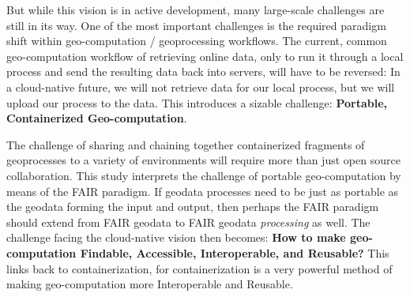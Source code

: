 But while this vision is in active development, many large-scale challenges are still in its way. 
One of the most important challenges is the required paradigm shift within geo-computation / geoprocessing workflows. 
The current, common geo-computation workflow of retrieving online data, only to run it through a local process and send the resulting data back into servers, will have to be reversed: In a cloud-native future, we will not retrieve data for our local process, but we will upload our process to the data.  
This introduces a sizable challenge: \textbf{Portable, Containerized Geo-computation}.



The challenge of sharing and chaining together containerized fragments of geoprocesses to a variety of environments will require more than just open source collaboration. 
This study interprets the challenge of portable geo-computation by means of the FAIR paradigm. 
If geodata processes need to be just as portable as the geodata forming the input and output, then perhaps the FAIR paradigm should extend from FAIR geodata to FAIR geodata \emph{processing} as well.
The challenge facing the cloud-native vision then becomes: \textbf{How to make geo-computation Findable, Accessible, Interoperable, and Reusable?} 
This links back to containerization, for containerization is a very powerful method of making geo-computation more Interoperable and Reusable.

